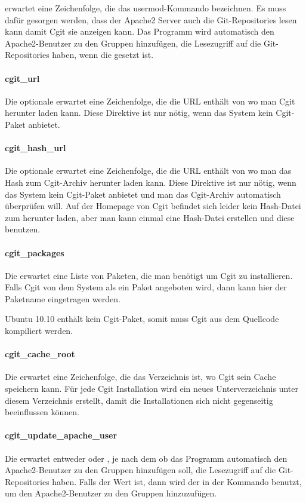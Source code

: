  erwartet eine Zeichenfolge, die das usermod-Kommando bezeichnen. Es muss dafür gesorgen werden, dass der Apache2 Server auch die Git-Repositories lesen kann damit Cgit sie anzeigen kann. Das Programm wird automatisch den Apache2-Benutzer zu den Gruppen hinzufügen, die Lesezugriff auf die Git-Repositories haben, wenn die  gesetzt ist.

\paragraph{cgit\_url}

Die optionale  erwartet eine Zeichenfolge, die die URL enthält von wo man Cgit herunter laden kann. Diese Direktive ist nur nötig, wenn das System kein Cgit-Paket anbietet.

\paragraph{cgit\_hash\_url}

Die optionale  erwartet eine Zeichenfolge, die die URL enthält von wo man das Hash zum Cgit-Archiv herunter laden kann. Diese Direktive ist nur nötig, wenn das System kein Cgit-Paket anbietet und man das Cgit-Archiv automatisch überprüfen will. Auf der Homepage von Cgit befindet sich leider kein Hash-Datei zum herunter laden, aber man kann einmal eine Hash-Datei erstellen und diese benutzen.

\paragraph{cgit\_packages}

Die  erwartet eine Liste von Paketen, die man benötigt um Cgit zu installieren. Falls Cgit von dem System als ein Paket angeboten wird, dann kann hier der Paketname eingetragen werden.

Ubuntu 10.10 enthält kein Cgit-Paket, somit muss Cgit aus dem Quellcode kompiliert werden.

\paragraph{cgit\_cache\_root}

Die  erwartet eine Zeichenfolge, die das Verzeichnis ist, wo Cgit sein Cache speichern kann. Für jede Cgit Installation wird ein neues Unterverzeichnis unter diesem Verzeichnis erstellt, damit die Installationen sich nicht gegenseitig beeinflussen können.

\paragraph{cgit\_update\_apache\_user}

Die  erwartet entweder  oder , je nach dem ob das Programm automatisch den Apache2-Benutzer zu den Gruppen hinzufügen soll, die Lesezugriff auf die Git-Repositories haben. Falls der Wert  ist, dann wird der in der  Kommando benutzt, um den Apache2-Benutzer zu den Gruppen hinzuzufügen.
